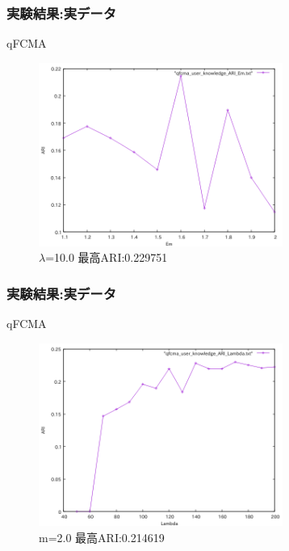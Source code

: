 \documentclass[13pt,dvipdfmx]{beamer}
\begin{document}
\begin{frame}\frametitle{実験結果:実データ}
  \begin{block}{qFCMA}
   \begin{figure}[htbp]
    \begin{center}
    \includegraphics[height=60mm]{qfcma_ARI_Em.png}
   \end{center}
   \captionsetup{labelformat=empty,labelsep=none}
   \caption{$\lambda$=10.0  最高ARI:0.229751}
  \end{figure}
 \end{block}
\end{frame}

\begin{frame}\frametitle{実験結果:実データ}
  \begin{block}{qFCMA}
   \begin{figure}[htbp]
    \begin{center}
    \includegraphics[height=60mm]{qfcma_ARI_Lambda.png}
   \end{center}
   \captionsetup{labelformat=empty,labelsep=none}
   \caption{m=2.0 最高ARI:0.214619}
  \end{figure}
 \end{block}
\end{frame}
\end{document}

